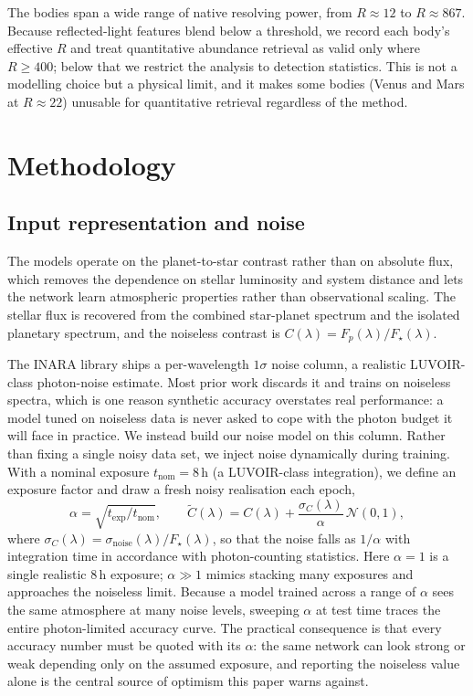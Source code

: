 \documentclass[11pt,twocolumn]{article}
\begin{document}
The bodies span a wide range of native resolving power, from $R\!\approx\!12$ to
$R\!\approx\!867$. Because reflected-light features blend below a threshold, we
record each body's effective $R$ and treat quantitative abundance retrieval as
valid only where $R\!\ge\!400$; below that we restrict the analysis to detection
statistics. This is not a modelling choice but a physical limit, and it makes
some bodies (Venus and Mars at $R\!\approx\!22$) unusable for quantitative
retrieval regardless of the method.

\section{Methodology}

\subsection{Input representation and noise}
\label{sec:input}

The models operate on the planet-to-star contrast rather than on absolute flux,
which removes the dependence on stellar luminosity and system distance and lets
the network learn atmospheric properties rather than observational scaling. The
stellar flux is recovered from the combined star-planet spectrum and the isolated
planetary spectrum, and the noiseless contrast is
$C(\lambda)=F_p(\lambda)/F_\star(\lambda)$.

The INARA library ships a per-wavelength $1\sigma$ noise column, a realistic
LUVOIR-class photon-noise estimate. Most prior work discards it and trains on
noiseless spectra, which is one reason synthetic accuracy overstates real
performance: a model tuned on noiseless data is never asked to cope with the
photon budget it will face in practice. We instead build our noise model on this
column. Rather than fixing a single noisy data set, we inject noise dynamically
during training. With a nominal exposure $t_\mathrm{nom}=8$\,h (a LUVOIR-class
integration), we define an exposure factor and draw a fresh noisy realisation
each epoch,
\begin{equation}
\alpha=\sqrt{t_\mathrm{exp}/t_\mathrm{nom}},\qquad
\tilde{C}(\lambda)=C(\lambda)+\frac{\sigma_C(\lambda)}{\alpha}\,\mathcal{N}(0,1),
\end{equation}
where $\sigma_C(\lambda)=\sigma_\mathrm{noise}(\lambda)/F_\star(\lambda)$, so
that the noise falls as $1/\alpha$ with integration time in accordance with
photon-counting statistics. Here $\alpha{=}1$ is a single realistic 8\,h
exposure; $\alpha{\gg}1$ mimics stacking many exposures and approaches the
noiseless limit. Because a model trained across a range of $\alpha$ sees the same
atmosphere at many noise levels, sweeping $\alpha$ at test time traces the entire
photon-limited accuracy curve. The practical consequence is that every accuracy
number must be quoted with its $\alpha$: the same network can look strong or weak
depending only on the assumed exposure, and reporting the noiseless value alone
is the central source of optimism this paper warns against.
\end{document}
